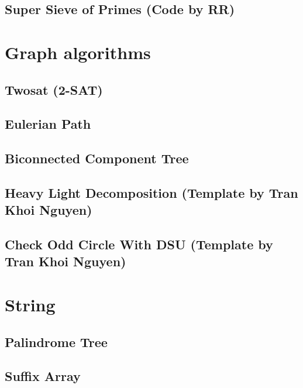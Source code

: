 \subsection{Super Sieve of Primes (Code by RR)}
\raggedbottom
\hrulefill

\section{Graph algorithms}
\subsection{Twosat (2-SAT)}
\raggedbottom
\hrulefill
\subsection{Eulerian Path}
\raggedbottom
\hrulefill
\subsection{Biconnected Component Tree}
\raggedbottom
\hrulefill
\subsection{Heavy Light Decomposition (Template by Tran Khoi Nguyen)}
\raggedbottom
\hrulefill
\subsection{Check Odd Circle With DSU (Template by Tran Khoi Nguyen)}
\raggedbottom
\hrulefill

\section{String}
\subsection{Palindrome Tree}
\raggedbottom
\hrulefill
\subsection{Suffix Array}
\raggedbottom
\hrulefill
